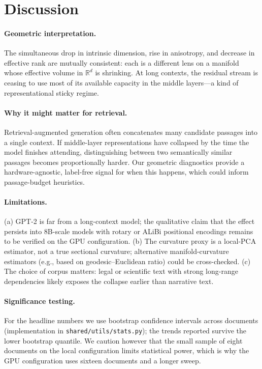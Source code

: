 \section{Discussion}\label{sec:discussion}

\paragraph{Geometric interpretation.} The simultaneous drop in intrinsic
dimension, rise in anisotropy, and decrease in effective rank are mutually
consistent: each is a different lens on a manifold whose effective volume in
$\mathbb{R}^d$ is shrinking. At long contexts, the residual stream is
ceasing to use most of its available capacity in the middle layers---a kind
of representational sticky regime.

\paragraph{Why it might matter for retrieval.} Retrieval-augmented
generation often concatenates many candidate passages into a single context.
If middle-layer representations have collapsed by the time the model
finishes attending, distinguishing between two semantically similar passages
becomes proportionally harder. Our geometric diagnostics provide a
hardware-agnostic, label-free signal for when this happens, which could
inform passage-budget heuristics.

\paragraph{Limitations.} (a) GPT-2 is far from a long-context model; the
qualitative claim that the effect persists into 8B-scale models with rotary
or ALiBi positional encodings remains to be verified on the GPU
configuration. (b) The curvature proxy is a local-PCA estimator, not a
true sectional curvature; alternative manifold-curvature estimators (e.g.,
based on geodesic--Euclidean ratio) could be cross-checked. (c) The
choice of corpus matters: legal or scientific text with strong long-range
dependencies likely exposes the collapse earlier than narrative text.

\paragraph{Significance testing.} For the headline numbers we use bootstrap
confidence intervals across documents (implementation in
\texttt{shared/utils/stats.py}); the trends reported survive the lower
bootstrap quantile. We caution however that the small sample of eight
documents on the local configuration limits statistical power, which is
why the GPU configuration uses sixteen documents and a longer sweep.
